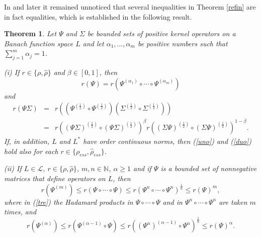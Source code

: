 \documentclass[12pt, reqno]{amsart}
\newtheorem{theorem}{Theorem}[section]
\theoremstyle{definition}
\theoremstyle{remark}
\numberwithin{equation}{section}
\newcommand{\be}{\begin{equation}}
\newcommand{\ee}{\end{equation}}
\newcommand{\NN}{\mathbb{N}}
\begin{document}
In \cite{P19} and later it remained unnoticed that several inequalities in Theorem \ref{refin}  are in fact equalities, which is established in the following result.  %
\begin{theorem}
\label{kathyprop}
Let $\Psi$ and $\Sigma$ be bounded sets of positive kernel operators on a Banach function space $L$ and let  $\alpha_1, \ldots , \alpha _m$ be positive numbers such that $\sum_{j=1}^{m}\alpha_j=1$.

\noindent (i) If $r \in \{\rho, \hat{\rho}\}$ and $\beta \in [0,1]$, then
\be
r(\Psi)=r(\Psi^{(\alpha_1)}\circ\cdots\circ \Psi^{(\alpha_m)})
\label{uno}
\ee
and
\begin{eqnarray}
\nonumber
r(\Psi\Sigma)&=&r((\Psi^{(\frac{1}{2})}\circ\Psi^{(\frac{1}{2})})(\Sigma^{(\frac{1}{2})}
\circ\Sigma^{(\frac{1}{2})}))\\
&=& r \left((\Psi \Sigma)^{\left(\frac{1}{2}\right)} \circ (\Psi \Sigma)^{\left(\frac{1}{2}\right)}\right) ^{\beta}   r \left((\Sigma\Psi)^{\left(\frac{1}{2}\right)} \circ ( \Sigma \Psi)^{\left(\frac{1}{2}\right)}\right) ^{1-\beta}.
\label{duo}
\end{eqnarray}
If, in addition, $L$ and $L^*$ have order continuous norms, then (\ref{uno}) and (\ref{duo}) hold also for each $r\in \{ \rho _{ess}, \hat{\rho} _{ess}\}$.

\medskip

(ii) If $L\in\mathcal L$, $r \in \{\rho, \hat{\rho}\}$, $ m,n \in\NN$, $\alpha\ge 1$ and if $\Psi$ is %
 a  bounded set of nonnegative matrices that define operators on $L$, then
\be
r(\Psi^{(m)})\le r(\Psi\circ\cdots\circ\Psi)\le r(\Psi ^n \circ\cdots\circ\Psi^n)^{\frac{1}{n}}\le r(\Psi)^{m},
\label{tre}
\ee
where in (\ref{tre}) the Hadamard products in $\Psi\circ\cdots\circ\Psi$ and in $\Psi ^n\circ\cdots\circ\Psi ^n$ are taken $m$ times, and
\be
r(\Psi^{(\alpha)})\le r(\Psi^{(\alpha-1)}\circ\Psi)\le  r((\Psi ^n)^{(\alpha-1)}\circ\Psi ^n)^{\frac{1}{n}} \le r(\Psi)^{\alpha}.
\label{tre1}
\ee
\end{theorem}
\end{document}
